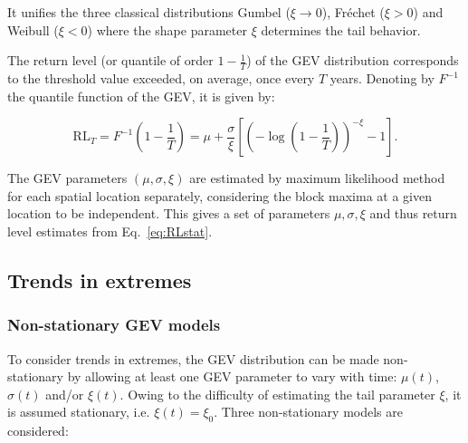 \documentclass[hess, manuscript]{copernicus}
\begin{document}
It unifies the three classical distributions Gumbel (\(\xi \to 0\)), Fréchet (\(\xi > 0\)) and Weibull (\(\xi < 0\)) where the shape parameter \(\xi\) determines the tail behavior.

The return level (or quantile of order \(1 - \tfrac{1}{T}\)) of the GEV
distribution corresponds to the threshold value exceeded, on
average, once every \(T\) years. 
Denoting by $F^{-1}$ the quantile function of the GEV, it is given by:

\begin{equation}\label{eq:RLstat}
\mathrm{RL}_{T}
= F^{-1}\!\left(1 - \frac{1}{T}\right)
= \mu + \frac{\sigma}{\xi}
\left[
\left(
-\log\!\left(1 - \frac{1}{T}\right)
\right)^{-\xi}
- 1
\right].
\end{equation}


The GEV parameters $(\mu,\sigma,\xi)$ are estimated by maximum likelihood method for each
spatial location separately, considering the block maxima at a given
location to be independent. This gives a set of parameters $\mu,\sigma,\xi$ and thus
return level estimates from Eq.~\ref{eq:RLstat}.

\subsection{Trends in extremes}\label{trends-in-extremes}

\subsubsection{Non-stationary GEV models}\label{non-stationary-gev}

To consider trends in extremes, the GEV distribution can be made non-stationary
by allowing at least one GEV parameter to vary with time: $\mu(t)$, $\sigma(t)$
and/or $\xi(t)$. Owing to the difficulty of estimating the tail parameter $\xi$,
it is assumed stationary, i.e. $\xi(t) = \xi_0$. Three non-stationary models are
considered:
\end{document}
